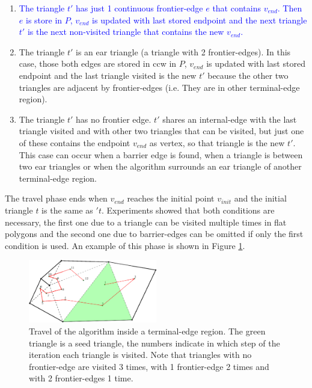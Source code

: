 \begin{enumerate}[label=\roman*)]
    \item \textcolor{blue}{ The triangle $t'$ has just 1 continuous frontier-edge $e$ that contains $v_{end}$. Then $e$ is store in $P$, $v_{end}$ is updated with last stored endpoint and the next triangle $t'$ is the next non-visited triangle that contains the new $v_{end}$.} %
    
    \item The triangle $t'$ is an ear triangle (a triangle with 2 frontier-edges). In this case, those both edges are stored in ccw in $P$, $v_{end}$ is updated with last stored endpoint and the last triangle visited is the new $t'$ because the other two triangles are adjacent by frontier-edges (i.e. They are in other terminal-edge region).
    
    \item The triangle $t'$ has no frontier edge. $t'$ shares an internal-edge with the last triangle visited and with other two triangles that can be visited, but just one of these contains the endpoint $v_{end}$ as vertex, so that triangle is the new $t'$. This case can occur when a barrier edge is found, when a triangle is between two ear triangles or when the algorithm surrounds an ear triangle of another terminal-edge region.
\end{enumerate}

The travel phase ends when $v_{end}$ reaches the initial point $v_{init}$ and the initial triangle $t$ is the same as $'t$. Experiments showed that both conditions are necessary, the first one due to a triangle can be visited multiple times in flat polygons and the second one due to barrier-edges can be omitted if only the first condition is used. An example of this phase is shown in Figure \ref{fig:travelphase}.

\begin{figure}[h]
    \centering
\includegraphics[width=0.5\textwidth]{travelphase2.eps}

    \caption{Travel of the algorithm inside a terminal-edge region. The green triangle is a seed triangle, the numbers indicate in which step of the iteration each triangle is visited. Note that triangles with no frontier-edge are visited 3 times, with 1 frontier-edge 2 times and with 2 frontier-edges 1 time.} 
    \label{fig:travelphase}
\end{figure}


